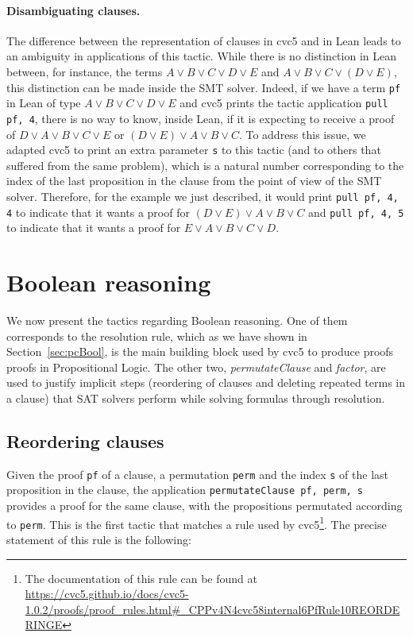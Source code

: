 \paragraph{Disambiguating clauses.} The difference between the representation of
clauses in cvc5 and in Lean leads to an ambiguity in applications of this tactic.
While there is no distinction in Lean between, for instance, the terms $A \vee B \vee C \vee D \vee E$
and $A \vee B \vee C \vee (D \vee E)$, this distinction can be made inside the SMT solver. Indeed, if
we have a term \texttt{pf} in Lean of type $A \vee B \vee C \vee D \vee E$ and cvc5 prints the tactic
application \texttt{pull pf, 4}, there is no way to know, inside Lean, if it is expecting to receive
a proof of $D \vee A \vee B \vee C \vee E$ or $(D \vee E) \vee A \vee B \vee C$. To address this issue,
we adapted cvc5 to print an extra parameter \texttt{s} to this tactic (and to others that suffered from the same problem),
which is a natural number corresponding to the index of the last proposition in the clause from the
point of view of the SMT solver. Therefore, for the example we just described, it would print
\texttt{pull pf, 4, 4} to indicate that it wants a proof for $(D \vee E) \vee A \vee B \vee C$ and
\texttt{pull pf, 4, 5} to indicate that it wants a proof for $E \vee A \vee B \vee C \vee D$.

\section{Boolean reasoning}

We now present the tactics regarding Boolean reasoning.
%
One of them corresponds to the resolution rule, which as we have shown in
Section~\ref{sec:pcBool}, is the main building block used by cvc5 to produce
proofs proofs in Propositional Logic.
%
The other two, \textit{permutateClause} and \textit{factor}, are used to justify
implicit steps (reordering of clauses and deleting repeated terms in a clause)
that SAT solvers perform while solving formulas through resolution.

\subsection{Reordering clauses}

Given the proof \texttt{pf} of a clause, a permutation \texttt{perm} and the index \texttt{s} of the last
proposition in the clause, the application \texttt{permutateClause pf, perm, s} provides a proof for the same clause, with
the propositions permutated according to \texttt{perm}.
This is the first tactic that matches a rule used by cvc5\footnote{The documentation of this rule can be found at \url{https://cvc5.github.io/docs/cvc5-1.0.2/proofs/proof\_rules.html\#\_CPPv4N4cvc58internal6PfRule10REORDERINGE}}. The precise statement
of this rule is the following:

